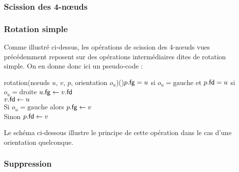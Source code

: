 		\subsubsection{Scission des 4-n\oe uds}
		
		\subsubsection{Rotation simple}
			
			Comme illustré ci-dessus, les opérations de scission des 4-n\oe uds vues précédemment reposent sur des opérations intermédiaires dites de rotation simple. On en donne donc ici un pseudo-code :
			
			\begin{pscode}{rotation}{(n\oe uds \(u\), \(v\), \(p\), orientation $o_u$)}{()}{\(p.\text{\textsf{fg}} = u\) si \(o_u = \text{gauche}\) et \(p.\text{\textsf{fd}} = u\) si $o_u = \text{droite}$}
				\(u.\text{\textsf{fg}} \gets v.\text{\textsf{fd}}\) \\
				\(v.\text{\textsf{fd}} \gets u\) \\
				Si \(o_u = \text{gauche}\) alors
					\(p.\text{\textsf{fg}} \gets v\) \\
				Sinon
					\(p.\text{\textsf{fd}} \gets v\)
			\end{pscode}
		
			Le schéma ci-dessous illustre le principe de cette opération dans le cas d'une orientation quelconque.
		
		\subsubsection{Suppression}
		
